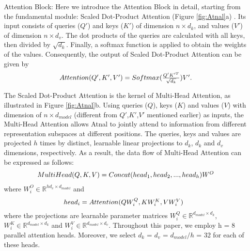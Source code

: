 \documentclass{WileyMSP-template}
\begin{document}
 
Attention Block: Here we introduce the Attention Block in detail, starting from 
the fundamental module: Scaled Dot-Product Attention 
(Figure \ref{fig:Atnal}a) \cite{vaswani2017attention}.  
Its input consists of queries ($Q'$) and keys ($K'$) 
of dimension $n \times d_k$, and values ($V'$) of  dimension $n \times d_{v}$. 
The dot products of the 
queries are  calculated with all keys, then divided by $\sqrt{d_{k}}$. Finally, 
a softmax function is applied to obtain the weights of the values. 
Consequently, the output of Scaled Dot-Product Attention can be given by
\begin{equation}
  \begin{minipage}[c]{0.80\linewidth}
    \centering
    $Attention(Q',K',V')=Softmax(\frac{Q'K'^T}{\sqrt{d_{k}}})V'$.
  \end{minipage}
  \label{eqn:Attention}
\end{equation}

The Scaled Dot-Product Attention is the kernel of Multi-Head Attention, 
as illustrated in Figure \ref{fig:Atnal}b. 
Using queries ($Q$), keys ($K$) and values ($V$) with 
dimension of $n \times d_{model}$ (different from $Q'$,$K'$,$V'$ mentioned earlier) as inputs,
the Multi-Head Attention allows Atnal to jointly attend to information 
from different representation subspaces 
at different positions. The queries, 
keys and values are projected  $h$ times by distinct, learnable linear projections 
to $d_k$, $d_k$ and $d_v$ dimensions, respectively. 
As a result, the data flow of Multi-Head Attention can be expressed as follows:
\begin{equation}
  \begin{minipage}[c]{0.80\linewidth}
    \centering
    $MultiHead(Q,K,V)= Concat(head_1,head_2,...,head_h)W^O $              \\
  \end{minipage}
  \label{eqn:MultiHeadAttn}
\end{equation}
where $W_i^O \in \mathbb{R}^{hd_v \times d_{model}}$ and 
\begin{equation}
  \begin{minipage}[c]{0.80\linewidth}
    \centering
    $head_i = Attention(QW_i^Q,KW_i^K,VW_i^V$) \,\,
  \end{minipage}
\end{equation}
where the projections are learnable parameter matrices 
$W_i^Q \in \mathbb{R}^{d_{model} \times d_k}$,
$W_i^K \in \mathbb{R}^{d_{model} \times d_k}$ and
$W_i^V \in \mathbb{R}^{d_{model} \times d_v}$. 
Throughout this paper, we employ h = 8 parallel attention heads. Moreover, 
we select $d_k$ = $d_v$ = $d_{model}/h$ = 32 for each of these heads. 
\end{document}
